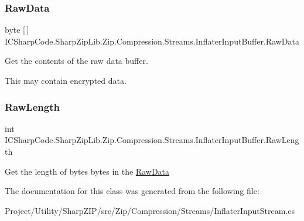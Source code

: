 \subsubsection{\texorpdfstring{Raw\+Data}{RawData}}
{\footnotesize\ttfamily byte \mbox{[}$\,$\mbox{]} I\+C\+Sharp\+Code.\+Sharp\+Zip\+Lib.\+Zip.\+Compression.\+Streams.\+Inflater\+Input\+Buffer.\+Raw\+Data\hspace{0.3cm}{\ttfamily [get]}}



Get the contents of the raw data buffer. 

This may contain encrypted data.\mbox{\label{class_i_c_sharp_code_1_1_sharp_zip_lib_1_1_zip_1_1_compression_1_1_streams_1_1_inflater_input_buffer_a8cd0feb60c6e6e66cf2f3c9ff130e9a7}} 
\subsubsection{\texorpdfstring{Raw\+Length}{RawLength}}
{\footnotesize\ttfamily int I\+C\+Sharp\+Code.\+Sharp\+Zip\+Lib.\+Zip.\+Compression.\+Streams.\+Inflater\+Input\+Buffer.\+Raw\+Length\hspace{0.3cm}{\ttfamily [get]}}



Get the length of bytes bytes in the \hyperlink{class_i_c_sharp_code_1_1_sharp_zip_lib_1_1_zip_1_1_compression_1_1_streams_1_1_inflater_input_buffer_ad0322f1bb4cbb6e847a593e2a4210107}{Raw\+Data} 



The documentation for this class was generated from the following file\+:\begin{DoxyCompactItemize}
\item 
Project/\+Utility/\+Sharp\+Z\+I\+P/src/\+Zip/\+Compression/\+Streams/Inflater\+Input\+Stream.\+cs\end{DoxyCompactItemize}
